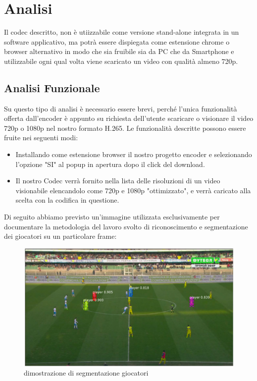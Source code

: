 \chapter{Analisi}
\label{chap:analysis}
Il codec descritto, non è utiizzabile come versione stand-alone integrata in un software applicativo, ma potrà essere dispiegata come estensione chrome o browser alternativo in modo che sia fruibile sia da PC che da Smartphone e utilizzabile ogni qual volta viene scaricato un video con qualità almeno 720p. 
\section{Analisi Funzionale}
\label{sec:func}
Su questo tipo di analisi è necessario essere brevi, perché l'unica funzionalità offerta dall'encoder è appunto su richiesta dell'utente scaricare o visionare il video 720p o 1080p nel nostro formato H.265.
Le funzionalità descritte possono essere fruite nei seguenti modi:
\begin{itemize}
\item Installando come estensione browser il nostro progetto encoder e selezionando l'opzione "SI" al popup in apertura dopo il click del download.
\item Il nostro Codec verrà fornito nella lista delle risoluzioni di un video visionabile elencandolo come 720p e 1080p "ottimizzato", e verrà caricato alla scelta con la codifica in questione. 
\end{itemize}
Di seguito abbiamo previsto un'immagine utilizzata esclusivamente per documentare la metodologia del lavoro svolto di riconoscimento e segmentazione dei giocatori su un particolare frame:
\begin{figure}
   \includegraphics[width=\linewidth]{images/dim.png}
   \caption{dimostrazione di segmentazione giocatori}
   \label{fig:dim}
\end{figure}
\newpage
